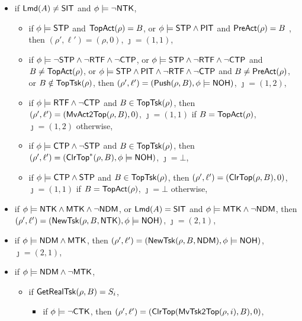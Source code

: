 {
\begin{itemize}
	\item if ${\sf Lmd}(A) \neq {\sf SIT}$ and $\phi \models \neg {\sf NTK}$, 
	\begin{itemize}
        \item if $\phi\models{\sf STP}$ and $\mathsf{TopAct}(\rho) = B$, or $\phi\models{\sf STP}\wedge{\sf PIT}$ and $\mathsf{PreAct}(\rho) = B$ , then $(\rho',\ell')=(\rho,0)$, $\jmath = (1,1)$,
        \item if $\phi\models\neg{\sf STP}\wedge\neg{\sf RTF}\wedge\neg{\sf CTP}$,
            or $\phi\models{\sf STP}\wedge\neg{\sf RTF}\wedge\neg{\sf CTP}$ and $B\neq\mathsf{TopAct}(\rho)$,
            or $\phi\models{\sf STP}\wedge{\sf PIT}\wedge\neg{\sf RTF}\wedge\neg{\sf CTP}$ and $B\neq\mathsf{PreAct}(\rho)$,
            or $B\notin\mathsf{TopTsk}(\rho)$,
                then $(\rho',\ell')=(\mathsf{Push}(\rho, B),\phi\models{\sf NOH})$, $\jmath = (1,2)$,
        \item if $\phi \models {\sf RTF} \wedge \neg {\sf CTP}$ and $B \in \mathsf{TopTsk}(\rho)$, then
         $(\rho',\ell')=(\mathsf{MvAct2Top}(\rho, B),0)$, $\jmath = (1,1)$ if $B = \mathsf{TopAct}(\rho)$, $\jmath = (1,2)$ otherwise,
        \item if $\phi \models{\sf CTP}\wedge\neg{\sf STP}$ and $B \in \mathsf{TopTsk}(\rho)$, then
        $(\rho',\ell') =(\mathsf{ClrTop}^*(\rho, B),\phi\models{\sf NOH})$, $\jmath = \bot$,
        \item if $\phi \models{\sf CTP}\wedge{\sf STP}$ and $B \in \mathsf{TopTsk}(\rho)$, then
        $(\rho',\ell') =(\mathsf{ClrTop}(\rho, B),0)$, $\jmath = (1,1)$ if $B = \mathsf{TopAct}(\rho)$, $\jmath = \bot$ otherwise,
	\end{itemize}
	\item if $\phi \models {\sf NTK}\wedge  {\sf MTK}\wedge\neg{\sf NDM}$, or ${\sf Lmd}(A) = {\sf SIT}$ and $\phi \models {\sf MTK}\wedge\neg{\sf NDM}$,  then $(\rho',\ell') = (\mathsf{NewTsk}(\rho, B, {\sf NTK}),\phi\models{\sf NOH})$, $\jmath = (2,1)$,
	\item if $\phi \models {\sf NDM}\wedge  {\sf MTK}$, then $(\rho',\ell') = (\mathsf{NewTsk}(\rho, B, {\sf NDM}),\phi\models{\sf NOH})$, $\jmath = (2,1)$,
	\item if $\phi \models {\sf NDM}\wedge\neg{\sf MTK}$, 
    \begin{itemize}
        \item if $\mathsf{GetRealTsk}(\rho,B) = S_i$, 
        \begin{itemize}
            \item if $\phi\models\neg{\sf CTK}$, then $(\rho',\ell')=(\mathsf{ClrTop}(\mathsf{MvTsk2Top}(\rho,i), B),0)$, 

\end{itemize}
\end{itemize}
\end{itemize}}
